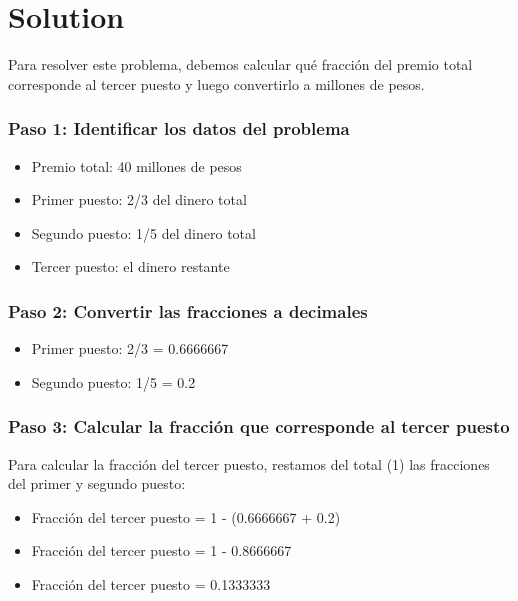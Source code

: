 \documentclass[
]{article}
\providecommand{\tightlist}{%
  \setlength{\itemsep}{0pt}\setlength{\parskip}{0pt}}
\begin{document}
\section{Solution}\label{solution}

Para resolver este problema, debemos calcular qué fracción del premio
total corresponde al tercer puesto y luego convertirlo a millones de
pesos.

\subsubsection{Paso 1: Identificar los datos del
problema}\label{paso-1-identificar-los-datos-del-problema}

\begin{itemize}
\tightlist
\item
  Premio total: 40 millones de pesos
\item
  Primer puesto: 2/3 del dinero total
\item
  Segundo puesto: 1/5 del dinero total
\item
  Tercer puesto: el dinero restante
\end{itemize}

\subsubsection{Paso 2: Convertir las fracciones a
decimales}\label{paso-2-convertir-las-fracciones-a-decimales}

\begin{itemize}
\tightlist
\item
  Primer puesto: 2/3 = 0.6666667
\item
  Segundo puesto: 1/5 = 0.2
\end{itemize}

\subsubsection{Paso 3: Calcular la fracción que corresponde al tercer
puesto}\label{paso-3-calcular-la-fracciuxf3n-que-corresponde-al-tercer-puesto}

Para calcular la fracción del tercer puesto, restamos del total (1) las
fracciones del primer y segundo puesto:

\begin{itemize}
\tightlist
\item
  Fracción del tercer puesto = 1 - (0.6666667 + 0.2)
\item
  Fracción del tercer puesto = 1 - 0.8666667
\item
  Fracción del tercer puesto = 0.1333333
\end{itemize}
\end{document}
